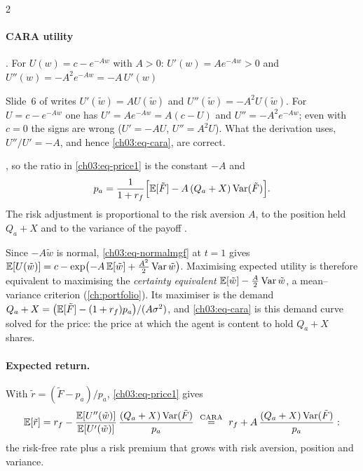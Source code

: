 \begin{paracol}{2}
\paragraph{CARA utility} . For $U(w)=c-e^{-Aw}$ with
$A>0$: $U'(w)=Ae^{-Aw}>0$ and $U''(w)=-A^2e^{-Aw}=-A\,U'(w)$\begin{coursenote}
Slide~6 of  writes $U'(\tilde w)=AU(\tilde w)$ and $U''(\tilde w)=-A^2U(\tilde w)$. For $U=c-e^{-Aw}$ one has
$U'=Ae^{-Aw}=A(c-U)$ and $U''=-A^2e^{-Aw}$; even with $c=0$ the signs are wrong ($U'=-AU$, $U''=A^2U$). What the
derivation uses, $U''/U'=-A$, and hence \eqref{ch03:eq-cara}, are correct.
\end{coursenote}, so the
ratio in \eqref{ch03:eq-price1} is the constant $-A$ and
\begin{equation}\label{ch03:eq-cara}
  p_a=\frac{1}{1+r_f}\Bigl[\mathbb{E}[\tilde F]-A\,(Q_a+X)\operatorname{Var}(\tilde F)\Bigr].
\end{equation}
The risk adjustment is proportional to the risk aversion $A$, to the
position held $Q_a+X$ and to the variance of the payoff
.

\begin{remark}[CARA and normal = mean--variance; not discussed in class]\label{ch03:rem-meanvar}
Since $-A\tilde w$ is normal, \eqref{ch03:eq-normalmgf} at $t=1$ gives $\mathbb{E}[U(\tilde w)]=c-\exp\bigl(-A\,\mathbb{E}[\tilde w]+\frac{A^2}{2}\operatorname{Var}\tilde w\bigr)$.
Maximising expected utility is therefore equivalent to maximising the \emph{certainty equivalent}
$\mathbb{E}[\tilde w]-\frac A2\operatorname{Var}\tilde w$, a mean--variance criterion (\cref{ch:portfolio}). Its maximiser is the demand
$Q_a+X=\bigl(\mathbb{E}[\tilde F]-(1+r_f)p_a\bigr)/(A\sigma^2)$, and \eqref{ch03:eq-cara} is this demand curve solved for the price:
the price at which the agent is content to hold $Q_a+X$ shares.
\end{remark}

\paragraph{Expected return.} With $\tilde r=(\tilde F-p_a)/p_a$, \eqref{ch03:eq-price1} gives
\[
  \mathbb{E}[\tilde r]=r_f-\frac{\mathbb{E}[U''(\tilde w)]}{\mathbb{E}[U'(\tilde w)]}\,\frac{(Q_a+X)\operatorname{Var}(\tilde F)}{p_a}
  \ \overset{\text{CARA}}{=}\ r_f+A\,\frac{(Q_a+X)\operatorname{Var}(\tilde F)}{p_a}:
\]
the risk-free rate plus a risk premium that grows with risk aversion, position and variance.


\end{paracol}

